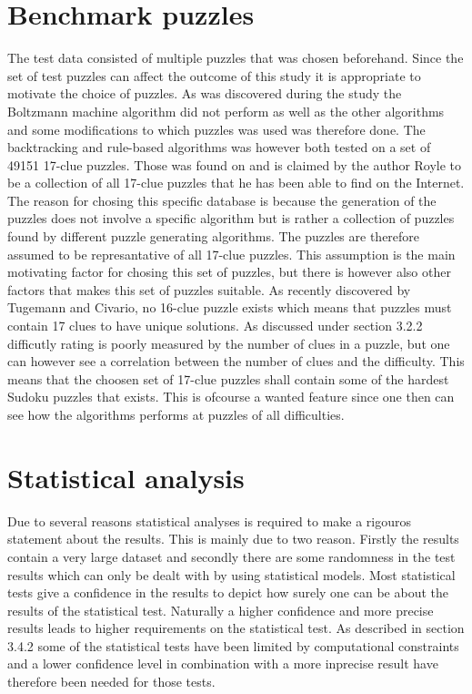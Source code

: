 \documentclass[a4paper,11pt]{kth-mag}
\begin{document}
\section{Benchmark puzzles}
The test data consisted of multiple puzzles that was chosen beforehand.
Since the set of test puzzles can affect the outcome of this study it is appropriate to motivate the choice of puzzles.
As was discovered during the study the Boltzmann machine algorithm did not perform as well as the other algorithms and some modifications to which puzzles was used was therefore done.
The backtracking and rule-based algorithms was however both tested on a set of 49151 17-clue puzzles. 
Those was found on \cite{database} and is claimed by the author Royle to be a collection of all 17-clue puzzles that he has been able to find on the Internet. 
The reason for chosing this specific database is because the generation of the puzzles does not involve a specific algorithm but is rather a collection of puzzles found by different puzzle generating algorithms.  
The puzzles are therefore assumed to be represantative of all 17-clue puzzles. 
This assumption is the main motivating factor for chosing this set of puzzles, but there is however also other factors that makes this set of puzzles suitable. 
As recently discovered by Tugemann and Civario, no 16-clue puzzle exists which means that puzzles must contain 17 clues to have unique solutions. \cite{17clueProof}  
As discussed under section 3.2.2 difficutly rating is poorly measured by the number of clues in a puzzle, but one can however see a correlation between the number of clues and the difficulty. \cite{difficulty}
This means that the choosen set of 17-clue puzzles shall contain some of the hardest Sudoku puzzles that exists.
This is ofcourse a wanted feature since one then can see how the algorithms performs at puzzles of all difficulties.

\section{Statistical analysis}
Due to several reasons statistical analyses is required to make a rigouros statement about the results. 
This is mainly due to two reason.
Firstly the results contain a very large dataset and secondly there are some randomness in the test results which can only be dealt with by using statistical models. 
Most statistical tests give a confidence in the results to depict how surely one can be about the results of the statistical test. Naturally a higher confidence and more precise results leads to higher requirements on the statistical test. As described in section 3.4.2 some of the statistical tests have been limited by computational constraints and a lower confidence level in combination with a more inprecise result have therefore been needed for those tests.
\end{document}
